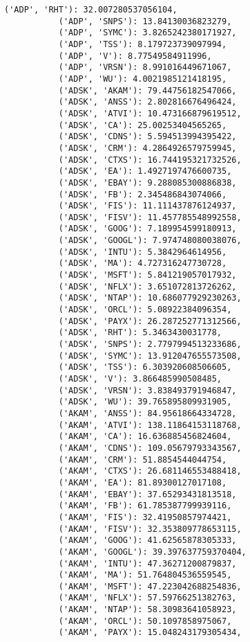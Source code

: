 \documentclass[11pt]{article}
\begin{document}
\begin{Verbatim}[commandchars=\\\{\}]
           ('ADP', 'RHT'): 32.007280537056104,
           ('ADP', 'SNPS'): 13.84130036823279,
           ('ADP', 'SYMC'): 3.8265242380171927,
           ('ADP', 'TSS'): 8.179723739097994,
           ('ADP', 'V'): 8.77549584911996,
           ('ADP', 'VRSN'): 8.991016449671067,
           ('ADP', 'WU'): 4.0021985121418195,
           ('ADSK', 'AKAM'): 79.44756182547066,
           ('ADSK', 'ANSS'): 2.802816676496424,
           ('ADSK', 'ATVI'): 10.473166879619512,
           ('ADSK', 'CA'): 25.00253404565265,
           ('ADSK', 'CDNS'): 5.594513994395422,
           ('ADSK', 'CRM'): 4.2864926579759945,
           ('ADSK', 'CTXS'): 16.744195321732526,
           ('ADSK', 'EA'): 1.4927197476600735,
           ('ADSK', 'EBAY'): 9.288085300886838,
           ('ADSK', 'FB'): 2.345486843074066,
           ('ADSK', 'FIS'): 11.111437876124937,
           ('ADSK', 'FISV'): 11.457785548992558,
           ('ADSK', 'GOOG'): 7.189954599180913,
           ('ADSK', 'GOOGL'): 7.974748080038076,
           ('ADSK', 'INTU'): 5.3842964614956,
           ('ADSK', 'MA'): 4.727316247730728,
           ('ADSK', 'MSFT'): 5.841219057017932,
           ('ADSK', 'NFLX'): 3.651072813726262,
           ('ADSK', 'NTAP'): 10.686077929230263,
           ('ADSK', 'ORCL'): 5.08922384096354,
           ('ADSK', 'PAYX'): 26.287252771312566,
           ('ADSK', 'RHT'): 5.3463430031778,
           ('ADSK', 'SNPS'): 2.7797994513233686,
           ('ADSK', 'SYMC'): 13.912047655573508,
           ('ADSK', 'TSS'): 6.303920608506605,
           ('ADSK', 'V'): 3.866485990508485,
           ('ADSK', 'VRSN'): 3.838493791946847,
           ('ADSK', 'WU'): 39.765895809931905,
           ('AKAM', 'ANSS'): 84.95618664334728,
           ('AKAM', 'ATVI'): 138.11864153118768,
           ('AKAM', 'CA'): 16.636885456824604,
           ('AKAM', 'CDNS'): 109.05679793343567,
           ('AKAM', 'CRM'): 51.8854544044754,
           ('AKAM', 'CTXS'): 26.681146553488418,
           ('AKAM', 'EA'): 81.89300127017108,
           ('AKAM', 'EBAY'): 37.65293431813518,
           ('AKAM', 'FB'): 61.785387799939116,
           ('AKAM', 'FIS'): 32.41950857974421,
           ('AKAM', 'FISV'): 32.353809778653115,
           ('AKAM', 'GOOG'): 41.62565878305333,
           ('AKAM', 'GOOGL'): 39.397637759370404,
           ('AKAM', 'INTU'): 47.36271200879837,
           ('AKAM', 'MA'): 51.764804536559545,
           ('AKAM', 'MSFT'): 47.223042688254836,
           ('AKAM', 'NFLX'): 57.59766251382763,
           ('AKAM', 'NTAP'): 58.30983641058923,
           ('AKAM', 'ORCL'): 50.1097858975067,
           ('AKAM', 'PAYX'): 15.048243179305434,

\end{Verbatim}
\end{document}
